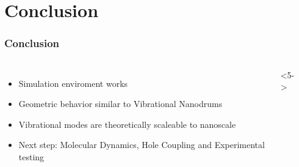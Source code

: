 \documentclass[hyperref={colorlinks=true,urlcolor=blue,linkcolor=.},aspectratio=1610,mathserif]{beamer}
\begin{document}
\section{Conclusion}

\begin{frame}
 \frametitle{Conclusion}
 \begin{columns}[T]
  \begin{itemize}
   \item<2-> Simulation enviroment works
   \item<3-> Geometric behavior similar to Vibrational Nanodrums
   \item<4-> Vibrational modes are theoretically scaleable to nanoscale
   \item<5-> Next step: Molecular Dynamics, Hole Coupling and Experimental testing
  \end{itemize}
  <5->
  \begin{center}

\end{center}
\end{columns}
\end{frame}
\end{document}
